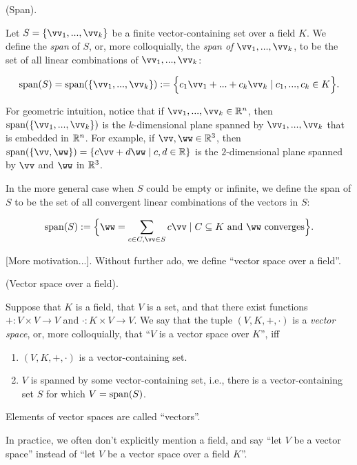 \begin{defn}
    (Span).
    
    Let $S = \{\vv_1, ..., \vv_k\}$ be a finite vector-containing set over a field $K$. We define the \textit{span} of $S$, or, more colloquially, the \textit{span of $\vv_1, ..., \vv_k$}, to be the set of all linear combinations of $\vv_1, ..., \vv_k$:
    
     \begin{align*}
        \spann(S) = \spann(\{\vv_1, ..., \vv_k\}) := \Big\{ c_1 \vv_1 + ... + c_k \vv_k \mid c_1, ..., c_k \in K \Big\}.
    \end{align*}
    
    For geometric intuition, notice that if $\vv_1, ..., \vv_k \in \R^n$, then $\spann(\{\vv_1, ..., \vv_k\})$ is the $k$-dimensional plane spanned by $\vv_1, ..., \vv_k$ that is embedded in $\mathbb{R}^n$. For example, if $\vv, \ww \in \R^3$, then ${\spann(\{\vv, \ww\}) = \{ c \vv + d \ww \mid c, d \in \R \}}$ is the $2$-dimensional plane spanned by $\vv$ and $\ww$ in $\mathbb{R}^3$.
    
    In the more general case when $S$ could be empty or infinite, we define the span of $S$ to be the set of all convergent linear combinations of the vectors in $S$:
    
    \begin{align*}
        \spann(S) := \Big\{ \ww = \sum_{c \in C, \vv \in S} c \vv \mid C \subseteq K \text{ and $\ww$ converges} \Big\}.
    \end{align*}
\end{defn}

[More motivation...]. Without further ado, we define ``vector space over a field''.

\begin{defn}
\label{ch::lin_alg::defn::vector_space}
    (Vector space over a field).
    
    Suppose that $K$ is a field, that $V$ is a set, and that there exist functions $+:V \times V \rightarrow V$ and $\cdot:K \times V \rightarrow V$. We say that the tuple $(V, K, +, \cdot)$ is a \textit{vector space}, or, more colloquially, that ``$V$ is a vector space over $K$'', iff 

    \begin{enumerate}
        \item $(V, K, +, \cdot)$ is a vector-containing set.
        \item $V$ is spanned by some vector-containing set, i.e., there is a vector-containing set $S$ for which $V = \text{span}(S)$. 
    \end{enumerate}
    
    Elements of vector spaces are called ``vectors''.
    
    In practice, we often don't explicitly mention a field, and say ``let $V$ be a vector space'' instead of ``let $V$ be a vector space over a field $K$''.
\end{defn}

